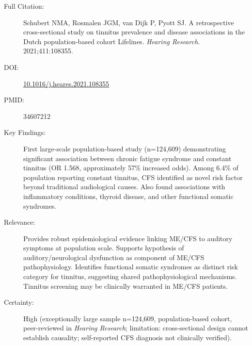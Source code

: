 \begin{description}
    \item[Full Citation:] Schubert NMA, Rosmalen JGM, van Dijk P, Pyott SJ. A retrospective cross-sectional study on tinnitus prevalence and disease associations in the Dutch population-based cohort Lifelines. \textit{Hearing Research}. 2021;411:108355.
    \item[DOI:] \href{https://doi.org/10.1016/j.heares.2021.108355}{10.1016/j.heares.2021.108355}
    \item[PMID:] 34607212
    \item[Key Findings:] First large-scale population-based study (n=124,609) demonstrating significant association between chronic fatigue syndrome and constant tinnitus (OR 1.568, approximately 57\% increased odds). Among 6.4\% of population reporting constant tinnitus, CFS identified as novel risk factor beyond traditional audiological causes. Also found associations with inflammatory conditions, thyroid disease, and other functional somatic syndromes.
    \item[Relevance:] Provides robust epidemiological evidence linking ME/CFS to auditory symptoms at population scale. Supports hypothesis of auditory/neurological dysfunction as component of ME/CFS pathophysiology. Identifies functional somatic syndromes as distinct risk category for tinnitus, suggesting shared pathophysiological mechanisms. Tinnitus screening may be clinically warranted in ME/CFS patients.
    \item[Certainty:] High (exceptionally large sample n=124,609, population-based cohort, peer-reviewed in \emph{Hearing Research}; limitation: cross-sectional design cannot establish causality; self-reported CFS diagnosis not clinically verified).
\end{description}

